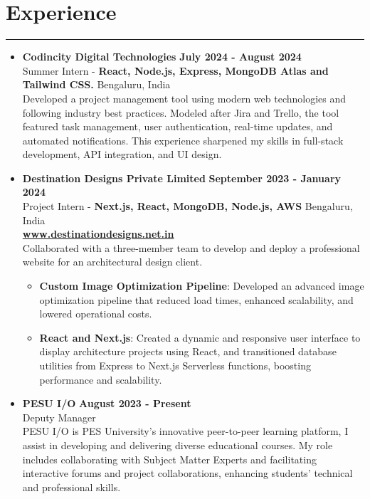 \documentclass[a4paper,10pt]{article}
\begin{document}
\section*{Experience}
\vspace{-.2em}
\hrule
\vspace{0.5em}
\begin{itemize}
    \item \textbf{Codincity Digital Technologies} \hfill \textbf{July 2024 - August 2024} \\ Summer Intern - \textbf{React, Node.js, Express, MongoDB Atlas and Tailwind CSS.} \vspace{0.25em} \hfill Bengaluru, India \\
    Developed a project management tool using modern web technologies and following industry best practices. Modeled after Jira and Trello, the tool featured task management, user authentication, real-time updates, and automated notifications. This experience sharpened my skills in full-stack development, API integration, and UI design.
    \vspace{0.5em}
          
    \item \textbf{Destination Designs Private Limited} \hfill \textbf{September 2023 - January 2024} \\
          Project Intern - \textbf{Next.js, React, MongoDB, Node.js, AWS} \hfill Bengaluru, India \\ \textbf{\href{https://www.destinationdesigns.net.in/}{www.destinationdesigns.net.in}}  \vspace{0.25em} \\ Collaborated with a three-member team to develop and deploy a professional website for an architectural design client. 
	      \begin{itemize}
		      \item \textbf{Custom Image Optimization Pipeline}: Developed an advanced image optimization pipeline that reduced load times, enhanced scalability, and lowered operational costs.
		      \item \textbf{React and Next.js}: Created a dynamic and responsive user interface to display architecture projects using React, and transitioned database utilities from Express to Next.js Serverless functions, boosting performance and scalability.
	      \end{itemize}
    \item \textbf{PESU I/O} \hfill \textbf{August 2023 - Present} \\ \vspace{0.5em}
    Deputy Manager \\
    PESU I/O is PES University's innovative peer-to-peer learning platform, I assist in developing and delivering diverse educational courses. My role includes collaborating with Subject Matter Experts and facilitating interactive forums and project collaborations, enhancing students' technical and professional skills.
\end{itemize}
\end{document}
